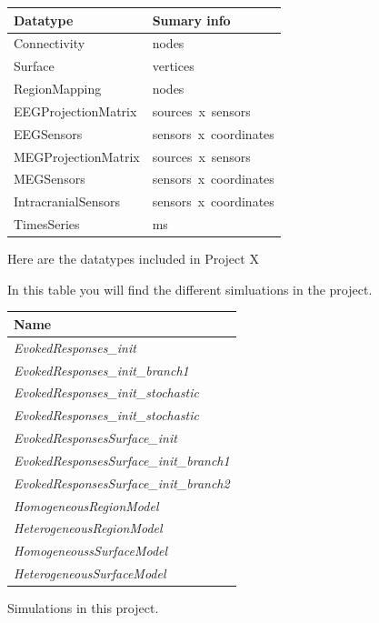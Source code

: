 \documentclass{tufte-handout}
\begin{document}
\begin{margintable}
  \centering
  \selectfont
  \begin{tabular}{ll}
    \toprule
    Datatype & Sumary info                       \\
    \midrule
    Connectivity         & \unit[X]{nodes}                    \\
    Surface              & \unit[15000 x 3]{vertices}     \\
    RegionMapping        & \unit[15000]{nodes}            \\
    EEGProjectionMatrix     & \unit[M x N]{sources x sensors} \\
    EEGSensors              & \unit[N x 4]{sensors x coordinates} \\
    MEGProjectionMatrix     & \unit[M x N]{sources x sensors} \\
    MEGSensors              & \unit[N x 4]{sensors x coordinates}\\
    IntracranialSensors     & \unit[N x 4]{sensors x coordinates} \\
    TimesSeries          & \unit[5000]{ms} \\
    \bottomrule
  \end{tabular}
  \caption{Here are the datatypes included in Project X}
  \label{tab:margintab}
\end{margintable}

In this table you will find the different simluations in the project.
\begin{margintable}
  \centering
  \selectfont
  \begin{tabular}{l}
    \toprule
    Name \\
    \midrule
    \textit{EvokedResponses\_init} \\
    \textit{EvokedResponses\_init\_branch1}  \\ 
    \textit{EvokedResponses\_init\_stochastic}  \\ 
    \textit{EvokedResponses\_init\_stochastic}  \\ 
    \textit{EvokedResponsesSurface\_init} \\
    \textit{EvokedResponsesSurface\_init\_branch1} \\
     \textit{EvokedResponsesSurface\_init\_branch2} \\
     \textit{HomogeneousRegionModel}\\
     \textit{HeterogeneousRegionModel} \\
     \textit{HomogeneoussSurfaceModel}\\
     \textit{HeterogeneousSurfaceModel}\\
    \bottomrule
  \end{tabular}
  \caption{Simulations in this project.}
  \label{tab:normaltab}
\end{margintable}
\end{document}
